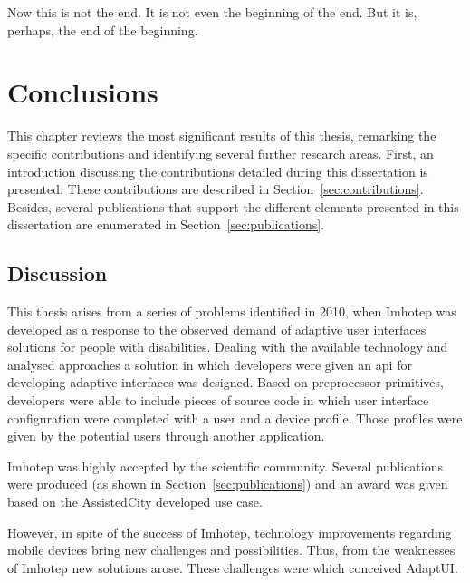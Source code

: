 

\begin{savequote}[50mm]
Now this is not the end. It is not even the beginning of the end. But it is, perhaps, the end of the beginning. 
\end{savequote}


\chapter{Conclusions}
\label{cha:Conclusions}

\ifpdf
    \graphicspath{{6_conclusion/figures/PDF/}}
\fi

This chapter reviews the most significant results of this thesis, remarking the 
specific contributions and identifying several further research areas. First, 
an introduction discussing the contributions detailed during this dissertation 
is presented. These contributions are described in Section~\ref{sec:contributions}. 
Besides, several publications that support the different elements presented in 
this dissertation are enumerated in Section~\ref{sec:publications}.


\section{Discussion}
\label{sec:discussion}

This thesis arises from a series of problems identified in 2010, when Imhotep
was developed as a response to the observed demand of adaptive user interfaces 
solutions for people with disabilities. Dealing with the available technology
and analysed approaches a solution in which developers were given an \ac{api}
for developing adaptive interfaces was designed. Based on preprocessor primitives,
developers were able to include pieces of source code in which user interface
configuration were completed with a user and a device profile. Those profiles
were given by the potential users through another application.

Imhotep was highly accepted by the scientific community. Several publications
were produced (as shown in Section~\ref{sec:publications}) and an award was 
given based on the AssistedCity developed use case.

However, in spite of the success of Imhotep, technology improvements regarding
mobile devices bring new challenges and possibilities. Thus, from the weaknesses
of Imhotep new solutions arose. These challenges were which conceived AdaptUI.

